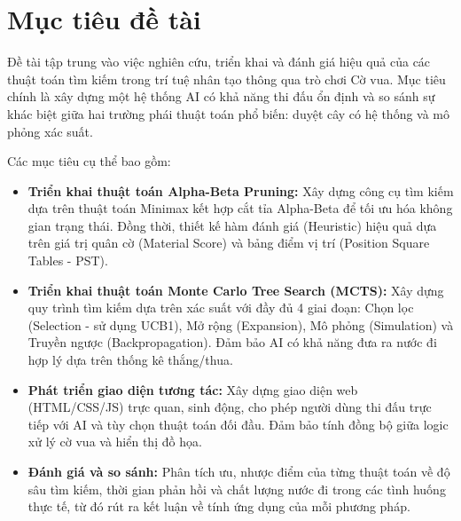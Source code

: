 \section{Mục tiêu đề tài}

Đề tài tập trung vào việc nghiên cứu, triển khai và đánh giá hiệu quả của các thuật toán tìm kiếm trong trí tuệ nhân tạo thông qua trò chơi Cờ vua. Mục tiêu chính là xây dựng một hệ thống AI có khả năng thi đấu ổn định và so sánh sự khác biệt giữa hai trường phái thuật toán phổ biến: duyệt cây có hệ thống và mô phỏng xác suất.

Các mục tiêu cụ thể bao gồm:
\begin{itemize}
    \item \textbf{Triển khai thuật toán Alpha-Beta Pruning:} Xây dựng công cụ tìm kiếm dựa trên thuật toán Minimax kết hợp cắt tỉa Alpha-Beta để tối ưu hóa không gian trạng thái. Đồng thời, thiết kế hàm đánh giá (Heuristic) hiệu quả dựa trên giá trị quân cờ (Material Score) và bảng điểm vị trí (Position Square Tables - PST).
    \item \textbf{Triển khai thuật toán Monte Carlo Tree Search (MCTS):} Xây dựng quy trình tìm kiếm dựa trên xác suất với đầy đủ 4 giai đoạn: Chọn lọc (Selection - sử dụng UCB1), Mở rộng (Expansion), Mô phỏng (Simulation) và Truyền ngược (Backpropagation). Đảm bảo AI có khả năng đưa ra nước đi hợp lý dựa trên thống kê thắng/thua.
    \item \textbf{Phát triển giao diện tương tác:} Xây dựng giao diện web (HTML/CSS/JS) trực quan, sinh động, cho phép người dùng thi đấu trực tiếp với AI và tùy chọn thuật toán đối đầu. Đảm bảo tính đồng bộ giữa logic xử lý cờ vua và hiển thị đồ họa.
    \item \textbf{Đánh giá và so sánh:} Phân tích ưu, nhược điểm của từng thuật toán về độ sâu tìm kiếm, thời gian phản hồi và chất lượng nước đi trong các tình huống thực tế, từ đó rút ra kết luận về tính ứng dụng của mỗi phương pháp.
\end{itemize}

